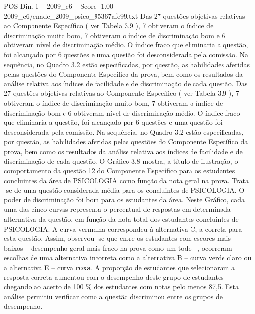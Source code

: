 \begin{textsample}{POS Dim 1 – 2009\_c6 – Score -1.00 – 2009\_c6/enade\_2009\_psico\_95367afe99.txt}
Das 27 questões objetivas relativas ao Componente Específico ( ver Tabela 3.9 ), 7 obtiveram o índice de discriminação muito bom, 7 obtiveram o índice de discriminação bom e 6 obtiveram nível de discriminação médio.
O índice fraco que eliminaria a questão, foi alcançado por 6 questões e uma questão foi desconsiderada pela comissão.
Na sequência, no Quadro 3.2 estão especificadas, por questão, as habilidades aferidas pelas questões do Componente Específico da prova, bem como os resultados da análise relativa aos índices de facilidade e de discriminação de cada questão.
Das 27 questões objetivas relativas ao Componente Específico ( ver Tabela 3.9 ), 7 obtiveram o índice de discriminação muito bom, 7 obtiveram o índice de discriminação bom e 6 obtiveram nível de discriminação médio.
O índice fraco que eliminaria a questão, foi alcançado por 6 questões e uma questão foi desconsiderada pela comissão.
Na sequência, no Quadro 3.2 estão especificadas, por questão, as habilidades aferidas pelas questões do Componente Específico da prova, bem como os resultados da análise relativa aos índices de facilidade e de discriminação de cada questão.
O Gráfico 3.8 mostra, a título de ilustração, o comportamento da questão 12 do Componente Específico para os estudantes concluintes da área de PSICOLOGIA como função da nota geral na prova.
Trata -se de uma questão considerada média para os concluintes de PSICOLOGIA.
O poder de discriminação foi bom para os estudantes da área.
Neste Gráfico, cada uma das cinco curvas representa o percentual de respostas em determinada alternativa da questão, em função da nota total dos estudantes concluintes de PSICOLOGIA.
A curva vermelha correspondeu à alternativa C, a correta para esta questão.
Assim, observou -se que entre os estudantes com escores mais baixos – desempenho geral mais fraco na prova como um todo –, ocorreram escolhas de uma alternativa incorreta como a alternativa B – curva verde claro ou a alternativa E – curva \textbf{roxa}.
A proporção de estudantes que selecionaram a resposta correta aumentou com o desempenho deste grupo de estudantes chegando ao acerto de 100 \% dos estudantes com notas pelo menos 87,5.
Esta análise permitiu verificar como a questão discriminou entre os grupos de desempenho.

\end{textsample}
